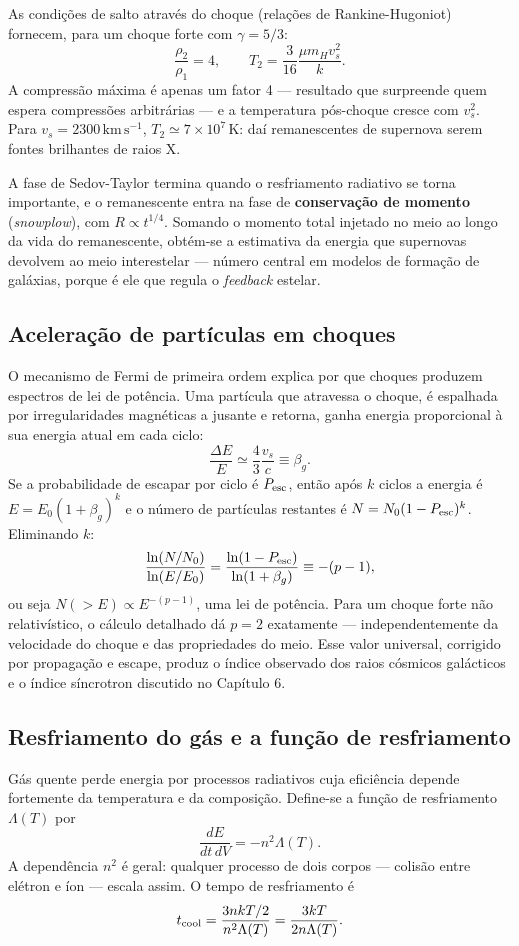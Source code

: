 \documentclass[11pt,a4paper]{article}
\begin{document}
As condições de salto através do choque (relações de Rankine-Hugoniot) fornecem, para um choque forte com $\gamma=5/3$:
\[
\frac{\rho_2}{\rho_1}=4,
\qquad
T_2=\frac{3}{16}\frac{\mu m_Hv_s^{2}}{k}.
\]
A compressão máxima é apenas um fator 4 --- resultado que surpreende quem espera compressões arbitrárias --- e a temperatura pós-choque cresce com $v_s^{2}$. Para $v_s=2300\,\mathrm{km\,s^{-1}}$, $T_2\simeq7\times10^{7}\,\mathrm{K}$: daí remanescentes de supernova serem fontes brilhantes de raios X.

A fase de Sedov-Taylor termina quando o resfriamento radiativo se torna importante, e o remanescente entra na fase de \textbf{conservação de momento} (\textit{snowplow}), com $R\propto t^{1/4}$. Somando o momento total injetado no meio ao longo da vida do remanescente, obtém-se a estimativa da energia que supernovas devolvem ao meio interestelar --- número central em modelos de formação de galáxias, porque é ele que regula o \textit{feedback} estelar.

\subsection*{Aceleração de partículas em choques}

O mecanismo de Fermi de primeira ordem explica por que choques produzem espectros de lei de potência. Uma partícula que atravessa o choque, é espalhada por irregularidades magnéticas a jusante e retorna, ganha energia proporcional à sua energia atual em cada ciclo:
\[
\frac{\Delta E}{E}\simeq\frac{4}{3}\frac{v_s}{c}\equiv\beta_g.
\]
Se a probabilidade de escapar por ciclo é $P_{\rm esc}$, então após $k$ ciclos a energia é $E=E_0(1+\beta_g)^{k}$ e o número de partículas restantes é $N=N_0(1-P_{\rm esc})^{k}$. Eliminando $k$:
\[
\frac{\ln(N/N_0)}{\ln(E/E_0)}=\frac{\ln(1-P_{\rm esc})}{\ln(1+\beta_g)}\equiv-(p-1),
\]
ou seja $N(>E)\propto E^{-(p-1)}$, uma lei de potência. Para um choque forte não relativístico, o cálculo detalhado dá $p=2$ exatamente --- independentemente da velocidade do choque e das propriedades do meio. Esse valor universal, corrigido por propagação e escape, produz o índice observado dos raios cósmicos galácticos e o índice síncrotron discutido no Capítulo 6.

\subsection*{Resfriamento do gás e a função de resfriamento}

Gás quente perde energia por processos radiativos cuja eficiência depende fortemente da temperatura e da composição. Define-se a função de resfriamento $\Lambda(T)$ por
\[
\frac{dE}{dt\,dV}=-n^{2}\Lambda(T).
\]
A dependência $n^{2}$ é geral: qualquer processo de dois corpos --- colisão entre elétron e íon --- escala assim. O tempo de resfriamento é
\[
t_{\rm cool}=\frac{3nkT/2}{n^{2}\Lambda(T)}=\frac{3kT}{2n\Lambda(T)}.
\]
\end{document}
